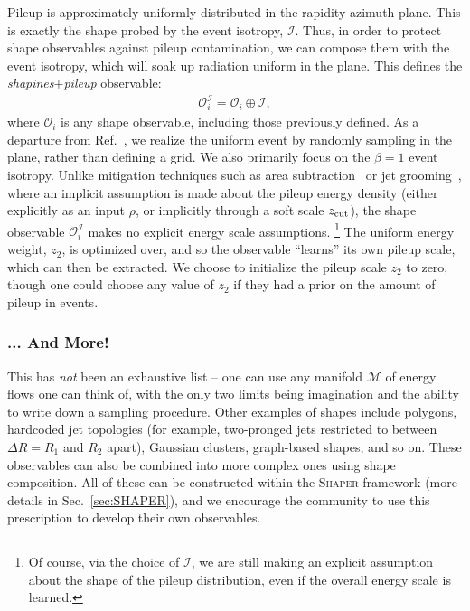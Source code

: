 \documentclass[letterpaper,11pt]{article}
\newcommand{\M}{\mathcal{M}}
\renewcommand{\O}{\mathcal{O}}
\DeclareRobustCommand{\Sec}[1]{Sec.~\ref{sec:#1}}
\DeclareRobustCommand{\Refer}[1]{Ref.~\cite{#1}}
\newcommand{\Shaper}{\textsc{Shaper}\xspace}
\begin{document}
Pileup is approximately uniformly distributed in the rapidity-azimuth plane. This is exactly the shape probed by the event isotropy, $\mathcal{I}$. Thus, in order to protect shape observables against pileup contamination, we can compose them with the event isotropy, which will soak up radiation uniform in the plane. This defines the \emph{shapines$+$pileup} observable:
%
\begin{align}
    \O^\mathcal{I}_i = \O_i \oplus \mathcal{I},
\end{align}
%
where $\O_i$ is any shape observable, including those previously defined. As a departure from \Refer{Cesarotti:2020hwb}, we realize the uniform event by randomly sampling in the plane, rather than defining a grid. We also primarily focus on the $\beta = 1$ event isotropy. Unlike mitigation techniques such as area subtraction~\cite{Cacciari_2008, Cacciari_2008_2, Soyez:2012hv} or jet grooming~\cite{Larkoski:2014wba, Dasgupta_2013}, where an implicit assumption is made about the pileup energy density (either explicitly as an input $\rho$, or implicitly through a soft scale $z_{\rm cut}$), the shape observable $\O^\mathcal{I}_i$ makes no explicit energy scale assumptions.%
%
\footnote{Of course, via the choice of $\mathcal{I}$, we are still making an explicit assumption about the shape of the pileup distribution, even if the overall energy scale is learned.} The uniform energy weight, $z_2$, is optimized over, and so the observable ``learns'' its own pileup scale, which can then be extracted. We choose to initialize the pileup scale $z_2$ to zero, though one could choose any value of $z_2$ if they had a prior on the amount of pileup in events.



\subsubsection{... And More!}

This has \emph{not} been an exhaustive list -- one can use any manifold $\M$ of energy flows one can think of, with the only two limits being imagination and the ability to write down a sampling procedure. Other examples of shapes include polygons, hardcoded jet topologies (for example, two-pronged jets restricted to between $\Delta R = R_1$ and $R_2$ apart), Gaussian clusters, graph-based shapes, and so on. These observables can also be combined into more complex ones using shape composition. All of these can be constructed within the \Shaper framework (more details in \Sec{SHAPER}), and we encourage the community to use this prescription to develop their own observables.
\end{document}
